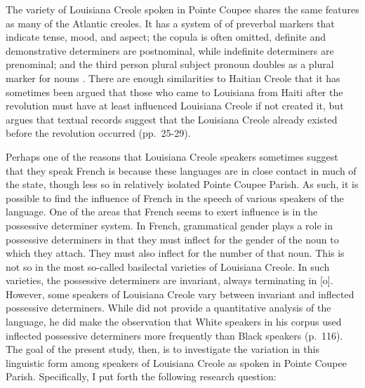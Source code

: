 \documentclass{article}
\begin{document}
    The variety of Louisiana Creole spoken in Pointe Coupee shares the same features as many of the Atlantic creoles. %
    It has a system of of preverbal markers that indicate tense, mood, and aspect; the copula is often omitted, definite and demonstrative determiners are postnominal, while indefinite determiners are prenominal; and the third person plural subject pronoun doubles as a plural marker for nouns \parencite[p.~63]{klingler_if_2003}.
    There are enough similarities to Haitian Creole that it has sometimes been argued that those who came to Louisiana from Haiti after the revolution must have at least influenced Louisiana Creole if not created it, but \textcite{klingler_if_2003} argues that textual records suggest that the Louisiana Creole already existed before the revolution occurred (pp.~25-29).

    Perhaps one of the reasons that Louisiana Creole speakers sometimes suggest that they speak French is because these languages are in close contact in much of the state, though less so in relatively isolated Pointe Coupee Parish.
    As such, it is possible to find the influence of French in the speech of various speakers of the language.
    One of the areas that French seems to exert influence is in the possessive determiner system. %
    In French, grammatical gender plays a role in possessive determiners in that they must inflect for the gender of the noun to which they attach.
    They must also inflect for the number of that noun. %
    This is not so in the most so-called basilectal varieties of Louisiana Creole.
    In such varieties, the possessive determiners are invariant, always terminating in [o]. %
    However, some speakers of Louisiana Creole vary between invariant and inflected possessive determiners.
    While \textcite{klingler_if_2003} did not provide a quantitative analysis of the language, he did make the observation that White speakers in his corpus used inflected possessive determiners more frequently than Black speakers (p.~116). %
    The goal of the present study, then, is to investigate the variation in this linguistic form among speakers of Louisiana Creole as spoken in Pointe Coupee Parish.
    Specifically, I put forth the following research question:
\end{document}
